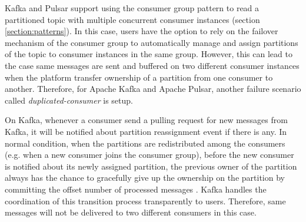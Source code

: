 Kafka and Pulsar support using the consumer group pattern to read a partitioned topic with multiple concurrent consumer instances (section \ref{section:patterns}). In this case, users have the option to rely on the failover mechanism of the consumer group to automatically manage and assign partitions of the topic to consumer instances in the same group. However, this can lead to the case same messages are sent and buffered on two different consumer instances when the platform transfer ownership of a partition from one consumer to another. Therefore, for Apache Kafka and Apache Pulsar, another failure scenario called \emph{duplicated-consumer} is setup.

On Kafka, whenever a consumer send a pulling request for new messages from Kafka, it will be notified about partition reassignment event if there is any. In normal condition, when the partitions are redistributed among the consumers (e.g. when a new consumer joins the consumer group), before the new consumer is notified about its newly assigned partition, the previous owner of the partition always has the chance to gracefully give up the ownership on the partition by committing the offset number of processed messages \cite{kafkaconsumerimplement}. Kafka handles the coordination of this transition process transparently to users. Therefore, same messages will not be delivered to two different consumers in this case. 

